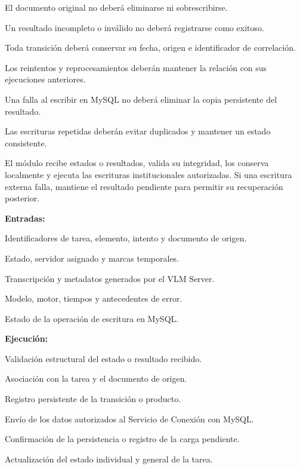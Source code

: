 \begin{definicionmodulo}
\item[Restricciones]
\begin{elementosmodulo}
    \item El documento original no deberá eliminarse ni sobrescribirse.
    \item Un resultado incompleto o inválido no deberá registrarse como exitoso.
    \item Toda transición deberá conservar su fecha, origen e identificador de correlación.
    \item Los reintentos y reprocesamientos deberán mantener la relación con sus ejecuciones anteriores.
    \item Una falla al escribir en MySQL no deberá eliminar la copia persistente del resultado.
    \item Las escrituras repetidas deberán evitar duplicados y mantener un estado consistente.
\end{elementosmodulo}

\item[Estructura general] El módulo recibe estados o resultados, valida su integridad, los conserva localmente y ejecuta las escrituras institucionales autorizadas. Si una escritura externa falla, mantiene el resultado pendiente para permitir su recuperación posterior.

\textbf{Entradas:}
\begin{elementosmodulo}
    \item Identificadores de tarea, elemento, intento y documento de origen.
    \item Estado, servidor asignado y marcas temporales.
    \item Transcripción y metadatos generados por el VLM Server.
    \item Modelo, motor, tiempos y antecedentes de error.
    \item Estado de la operación de escritura en MySQL.
\end{elementosmodulo}

\textbf{Ejecución:}
\begin{elementosmodulo}
    \item Validación estructural del estado o resultado recibido.
    \item Asociación con la tarea y el documento de origen.
    \item Registro persistente de la transición o producto.
    \item Envío de los datos autorizados al Servicio de Conexión con MySQL.
    \item Confirmación de la persistencia o registro de la carga pendiente.
    \item Actualización del estado individual y general de la tarea.
\end{elementosmodulo}


\end{definicionmodulo}
